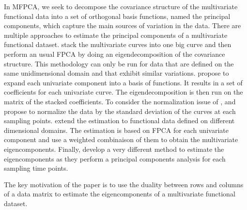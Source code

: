 In MFPCA, we seek to decompose the covariance structure of the multivariate functional data into a set of orthogonal basis functions, named the principal components, which capture the main sources of variation in the data. There are multiple approaches to estimate the principal components of a multivariate functional dataset. \cite{ramsayFunctionalDataAnalysis2005} stack the multivariate curves into one big curve and then perform an usual FPCA by doing an eigendecomposition of the covariance structure. This methodology can only be run for data that are defined on the same unidimensional domain and that exhibit similar variations. \cite{jacquesModelbasedClusteringMultivariate2014a} propose to expand each univariate component into a basis of functions. It results in a set of coefficients for each univariate curve. The eigendecomposition is then run on the matrix of the stacked coefficients. To consider the normalization issue of \cite{ramsayFunctionalDataAnalysis2005}, \cite{jacquesModelbasedClusteringMultivariate2014a} and \cite{chiouMultivariateFunctionalPrincipal2014} propose to normalize the data by the standard deviation of the curves at each sampling points. \cite{happMultivariateFunctionalPrincipal2015} extend the estimation to functional data defined on different dimensional domains. The estimation is based on FPCA for each univariate component and use a weighted combinaison of them to obtain the multivariate eigencomponents. Finally, \cite{berrenderoPrincipalComponentsMultivariate2011} develop a very different method to estimate the eigencomponents as they perform a principal components analysis for each sampling time points.

The key motivation of the paper is to use the duality between rows and columns of a data matrix to estimate the eigencomponents of a multivariate functional dataset.

